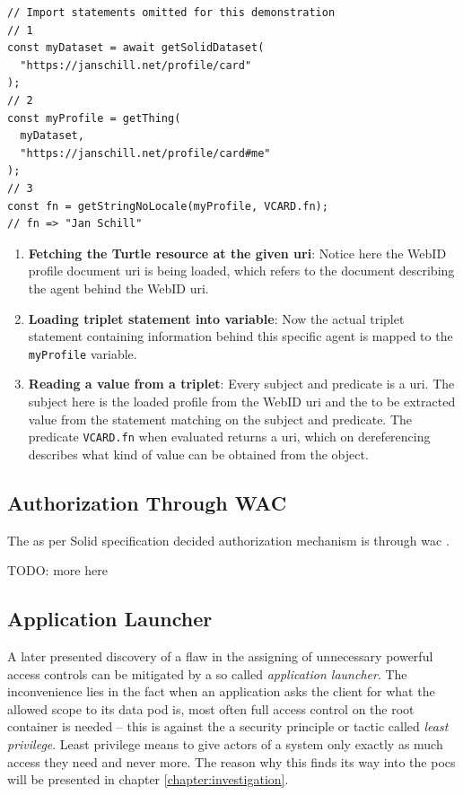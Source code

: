 \begin{lstlisting}[language=Other,columns=fullflexible, caption={Basic usage of Inrupt's solid-client library.}, label={lst:2}]
// Import statements omitted for this demonstration
// 1
const myDataset = await getSolidDataset(
  "https://janschill.net/profile/card"
);
// 2
const myProfile = getThing(
  myDataset,
  "https://janschill.net/profile/card#me"
);
// 3
const fn = getStringNoLocale(myProfile, VCARD.fn);
// fn => "Jan Schill"
\end{lstlisting}

\begin{enumerate}
    \item \textbf{Fetching the Turtle resource at the given \gls{uri}}: Notice here the WebID profile document \gls{uri} is being loaded, which refers to the document describing the agent behind the WebID \gls{uri}.
    \item \textbf{Loading triplet statement into variable}: Now the actual triplet statement containing information behind this specific agent is mapped to the \texttt{myProfile} variable.
    \item \textbf{Reading a value from a triplet}: Every subject and predicate is a \gls{uri}. The subject here is the loaded profile from the WebID \gls{uri} and the to be extracted value from the statement matching on the subject and predicate. The predicate \texttt{VCARD.fn} when evaluated returns a \gls{uri}, which on dereferencing describes what kind of value can be obtained from the object.
\end{enumerate}

\subsection{Authorization Through WAC}

The as per Solid specification decided authorization mechanism is through \gls{wac} \cite{wac}.

TODO: more here

\subsection{Application Launcher}

A later presented discovery of a flaw in the assigning of unnecessary powerful access controls can be mitigated by a so called \textit{application launcher}. The inconvenience lies in the fact when an application asks the client for what the allowed scope to its data pod is, most often full access control on the root container is needed -- this is against the a security principle or tactic called \textit{least privilege}. Least privilege means to give actors of a system only exactly as much access they need and never more. The reason why this finds its way into the \glspl{poc} will be presented in chapter \ref{chapter:investigation}.

